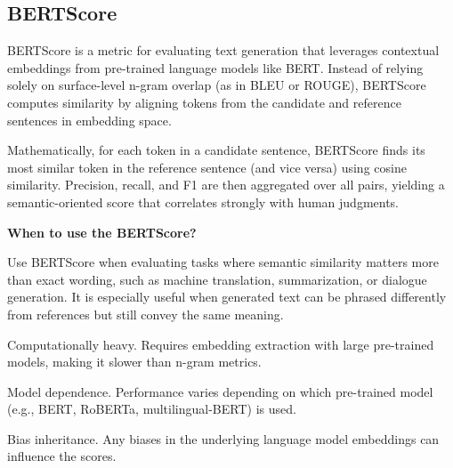 \subsection{BERTScore}


BERTScore is a metric for evaluating text generation that leverages contextual embeddings from pre-trained language models like BERT.
Instead of relying solely on surface-level n-gram overlap (as in BLEU or ROUGE), BERTScore computes similarity by aligning tokens from the
candidate and reference sentences in embedding space.

\begin{center}
\end{center}

Mathematically, for each token in a candidate sentence, BERTScore finds its most similar token in the reference sentence (and vice versa)
using cosine similarity. Precision, recall, and F1 are then aggregated over all pairs, yielding a semantic-oriented score that correlates
strongly with human judgments.

\textbf{When to use the BERTScore?}

Use BERTScore when evaluating tasks where semantic similarity matters more than exact wording, such as machine translation, summarization, or
dialogue generation. It is especially useful when generated text can be phrased differently from references but still convey the same meaning.

{
\item Computationally heavy. Requires embedding extraction with large pre-trained models, making it slower than n-gram metrics.
\item Model dependence. Performance varies depending on which pre-trained model (e.g., BERT, RoBERTa, multilingual-BERT) is used.
\item Bias inheritance. Any biases in the underlying language model embeddings can influence the scores.
}

